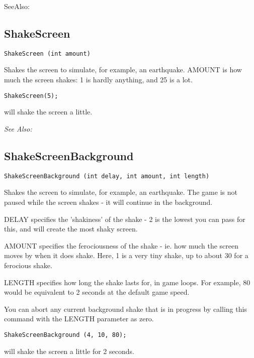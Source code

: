 SeeAlso: 


\subsection{ShakeScreen}\label{ShakeScreen}%

\begin{verbatim}
ShakeScreen (int amount)
\end{verbatim}
Shakes the screen to simulate, for example, an earthquake. AMOUNT is
how much the screen shakes: 1 is hardly anything, and 25 is a lot.

\begin{verbatim}
ShakeScreen(5);
\end{verbatim}
will shake the screen a little.

\it{See Also:} 


\subsection{ShakeScreenBackground}\label{ShakeScreenBackground}%

\begin{verbatim}
ShakeScreenBackground (int delay, int amount, int length)
\end{verbatim}
Shakes the screen to simulate, for example, an earthquake. The game is not paused
while the screen shakes - it will continue in the background.

DELAY specifies the 'shakiness' of the shake - 2 is the lowest you can pass for this,
and will create the most shaky screen.

AMOUNT specifies the ferociousness of the shake - ie. how much the screen moves by when it
does shake. Here, 1 is a very tiny shake, up to about 30 for a ferocious shake.

LENGTH specifies how long the shake lasts for, in game loops. For example, 80 would be
equivalent to 2 seconds at the default game speed.

You can abort any current background shake that is in progress by calling this command
with the LENGTH parameter as zero.

\begin{verbatim}
ShakeScreenBackground (4, 10, 80);
\end{verbatim}
will shake the screen a little for 2 seconds.

